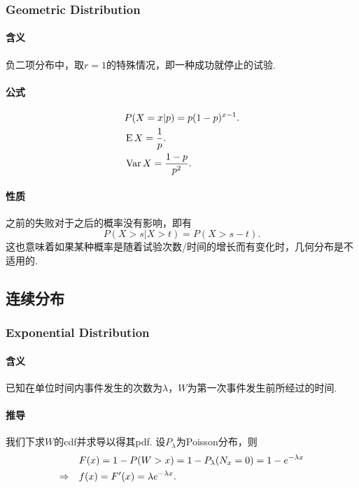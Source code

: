   \subsubsection{Geometric Distribution}
    \paragraph{含义}
    负二项分布中，取$r=1$的特殊情况，即一种成功就停止的试验. 

    \paragraph{公式}
    \begin{align*}
      &P(X=x|p) = p(1-p)^{x-1}. \\
      &\operatorname{E} X = \frac{1}{p}. \\
      &\operatorname{Var} X = \frac{1-p}{p^2}. 
    \end{align*}

    \paragraph{性质}
    之前的失败对于之后的概率没有影响，即有
    \[
      P(X>s|X>t) = P(X>s-t).
    \]
    这也意味着如果某种概率是随着试验次数/时间的增长而有变化时，几何分布是不适用的. 
\subsection{连续分布}
  \subsubsection{Exponential Distribution}
    \paragraph{含义}
    已知在单位时间内事件发生的次数为$\lambda$，$W$为第一次事件发生前所经过的时间. 

    \paragraph{推导}
    我们下求$W$的cdf并求导以得其pdf. 设$P_\lambda$为Poisson分布，则
    \begin{align*}
      & F(x)=1-P(W>x) = 1-P_\lambda(N_x=0) = 1-e^{-\lambda x} \\
      \Rightarrow\quad &
        f(x) = F^\prime(x) = \lambda e^{-\lambda x}.
    \end{align*}

